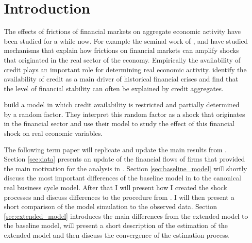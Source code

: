 
\section{Introduction}
\label{sec:introduction}

The effects of frictions of financial markets on aggregate economic activity
have been studied for a while now. For example the seminal work of
\textcite{kiyotaki_credit_1997}, \textcite{bernanke_agency_1989} and
\textcite{bernanke_financial_1999} have studied mechanisms that explain how
frictions on financial markets can amplify shocks that originated in the real
sector of the economy. Empirically the availability of credit plays an
important role for determining real economic
activity. \textcite{kindleberger_manias_2011} identify the availability of
credit as a main driver of historical financial crises and
\textcite{schularick_credit_2012} find that the level of financial stability
can often be explained by credit aggregates.

\textcite{jerman_macroeconomic_2012} build a model in which credit availability
is restricted and partially determined by a random factor. They interpret this
random factor as a shock that originates in the financial sector and use their
model to study the effect of this financial shock on real economic variables.

The following term paper will replicate and update the main results from
\textcite{jerman_macroeconomic_2012}. Section \ref{sec:data} presents an update
of the financial flows of firms that provided the main motivation for the
analysis in \textcite{jerman_macroeconomic_2012}. Section
\ref{sec:baseline_model} will shortly discuss the most important differences of
the baseline model in \textcite{jerman_macroeconomic_2012} to the canonical
real business cycle model. After that I will present how I created the shock
processes and discuss differences to the procedure from
\citeauthor{jerman_macroeconomic_2012}. I will then present a short comparison
of the model simulation to the observed data. Section \ref{sec:extended_model}
introduces the main differences from the extended model to the baseline model,
will present a short description of the estimation of the extended model and
then discuss the convergence of the estimation process.